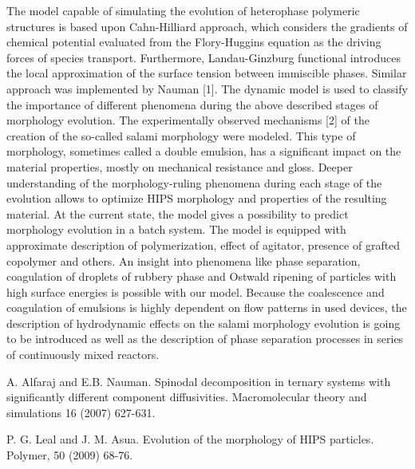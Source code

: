 The model capable of simulating the evolution of heterophase polymeric structures is based upon Cahn-Hilliard approach, which considers the gradients of chemical potential evaluated from the Flory-Huggins equation as the driving forces of species transport. Furthermore, Landau-Ginzburg functional introduces the local approximation of the surface tension between immiscible phases.  Similar approach was implemented by Nauman [1]. The dynamic model is used to classify the importance of different phenomena during the above described stages of morphology evolution. The experimentally observed mechanisms [2] of the creation of the so-called salami morphology were modeled. This type of morphology, sometimes called a double emulsion, has a significant impact on the material properties, mostly on mechanical resistance and gloss. Deeper understanding of the morphology-ruling phenomena during each stage of the evolution allows to optimize HIPS morphology and properties of the resulting material. At the current state, the model gives a possibility to predict morphology evolution in a batch system. The model is equipped with approximate description of polymerization, effect of agitator, presence of grafted copolymer and others. An insight into phenomena like phase separation, coagulation of droplets of rubbery phase and Ostwald ripening of particles with high surface energies is possible with our model. Because the coalescence and coagulation of emulsions is highly dependent on flow patterns in used devices, the description of hydrodynamic effects on the salami morphology evolution is going to be introduced as well as the description of phase separation processes in series of continuously mixed reactors. 



\begin{thebibliography}{10}

{\sc A. Alfaraj and E.B. Nauman}. {Spinodal decomposition in ternary systems with significantly different component diffusivities}. Macromolecular theory and simulations 16 (2007) 627-631.



{\sc P. G. Leal and J. M. Asua}. {Evolution of the morphology of HIPS particles}. Polymer, 50 (2009) 68-76.

\end{thebibliography}
